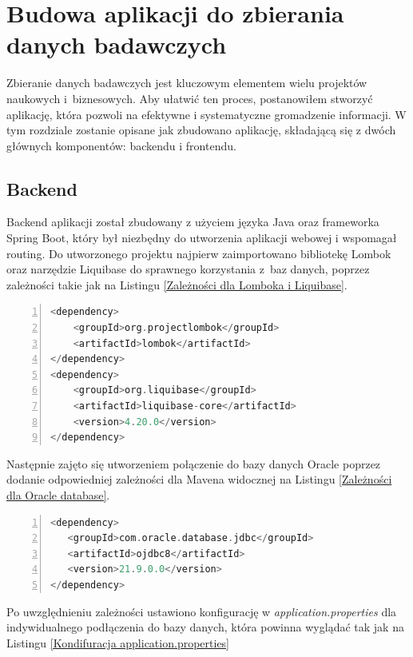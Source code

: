 \chapter{Budowa aplikacji do zbierania danych badawczych}

Zbieranie danych badawczych jest kluczowym elementem wielu projektów naukowych i~biznesowych. Aby ułatwić ten proces, postanowiłem stworzyć aplikację, która pozwoli na efektywne i systematyczne gromadzenie informacji. W tym rozdziale zostanie opisane jak zbudowano aplikację, składającą się z dwóch głównych komponentów: backendu i frontendu.

\section{Backend}

Backend aplikacji został zbudowany z użyciem języka Java oraz frameworka Spring Boot, który był niezbędny do utworzenia aplikacji webowej i wspomagał routing.
Do utworzonego projektu najpierw zaimportowano bibliotekę Lombok oraz narzędzie Liquibase do sprawnego korzystania z~baz danych, poprzez zależności takie jak na Listingu \ref{Zależności dla Lomboka i Liquibase}.
\begin{lstlisting}[language=C, mathescape, frame=single, numbers=left, xleftmargin=2em, framexleftmargin=2em, basicstyle=\ttfamily\bfseries, caption={Zależności dla Lomboka i Liquibase}, label={Zależności dla Lomboka i Liquibase}]
<dependency>
    <groupId>org.projectlombok</groupId>
    <artifactId>lombok</artifactId>
</dependency>
<dependency>
    <groupId>org.liquibase</groupId>
    <artifactId>liquibase-core</artifactId>
    <version>4.20.0</version>
</dependency>      
\end{lstlisting}

Następnie zajęto się utworzeniem połączenie do bazy danych Oracle poprzez dodanie odpowiedniej zależności dla Mavena widocznej na Listingu \ref{Zależności dla Oracle database}.
\begin{lstlisting}[language=C, mathescape, frame=single, numbers=left, xleftmargin=2em, framexleftmargin=2em, basicstyle=\ttfamily\bfseries, caption={Zależności dla Oracle database}, label={Zależności dla Oracle database}]
<dependency>
   <groupId>com.oracle.database.jdbc</groupId>
   <artifactId>ojdbc8</artifactId>
   <version>21.9.0.0</version>
</dependency>
\end{lstlisting}
Po uwzględnieniu zależności ustawiono konfigurację w \textit{application.properties} dla indywidualnego podłączenia do bazy danych, która powinna wyglądać tak jak na Listingu \ref{Kondifuracja application.properties}

